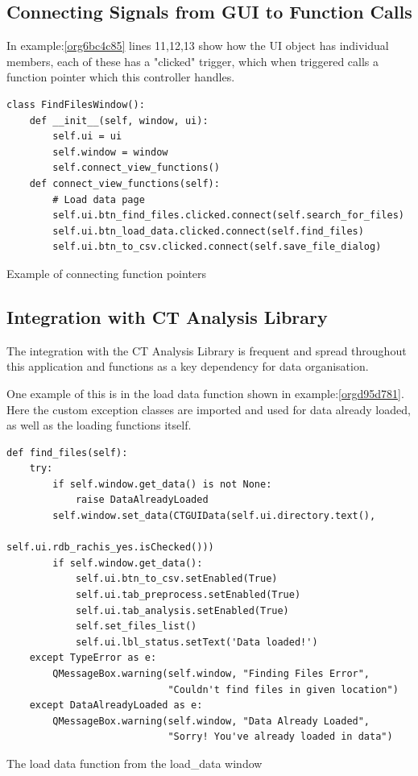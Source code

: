 \documentclass[11pt]{report}
\begin{document}
\subsection{Connecting Signals from GUI to Function Calls}
\label{sec:orgf84b511}
In example:\ref{org6bc4c85} lines 11,12,13 show how the UI object has individual members, each of these has a "clicked" trigger, which when triggered calls a function pointer which this controller handles.
\begin{listing}[htbp]
\begin{verbatim}
class FindFilesWindow():
    def __init__(self, window, ui):
        self.ui = ui
        self.window = window
        self.connect_view_functions()
    def connect_view_functions(self):
        # Load data page
        self.ui.btn_find_files.clicked.connect(self.search_for_files)
        self.ui.btn_load_data.clicked.connect(self.find_files)
        self.ui.btn_to_csv.clicked.connect(self.save_file_dialog)
\end{verbatim}
\caption{\label{org6bc4c85}
Example of connecting function pointers}
\end{listing}

\subsection{Integration with CT Analysis Library}
\label{sec:org0c9c03f}

The integration with the CT Analysis Library is frequent and spread throughout this application and functions as a key dependency for data organisation.

One example of this is in the load data function shown in example:\ref{orgd95d781}. Here the custom exception classes are imported and used for data already loaded, as well as the loading functions itself.

\begin{listing}[htbp]
\begin{verbatim}
def find_files(self):
    try:
        if self.window.get_data() is not None:
            raise DataAlreadyLoaded
        self.window.set_data(CTGUIData(self.ui.directory.text(),
                                       self.ui.rdb_rachis_yes.isChecked()))
        if self.window.get_data():
            self.ui.btn_to_csv.setEnabled(True)
            self.ui.tab_preprocess.setEnabled(True)
            self.ui.tab_analysis.setEnabled(True)
            self.set_files_list()
            self.ui.lbl_status.setText('Data loaded!')
    except TypeError as e:
        QMessageBox.warning(self.window, "Finding Files Error",
                            "Couldn't find files in given location")
    except DataAlreadyLoaded as e:
        QMessageBox.warning(self.window, "Data Already Loaded",
                            "Sorry! You've already loaded in data")
\end{verbatim}
\caption{\label{orgd95d781}
The load data function from the load\_data window}
\end{listing}
\end{document}
